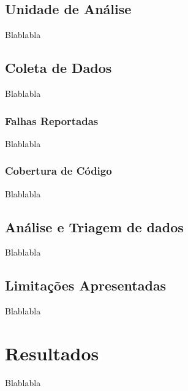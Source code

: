 \documentclass[11.5pt]{article}
\begin{document}
\subsection{Unidade de Análise}
Blablabla


\subsection{Coleta de Dados}
Blablabla

\subsubsection{Falhas Reportadas}
Blablabla

\subsubsection{Cobertura de Código}
Blablabla


\subsection{Análise e Triagem de dados}
Blablabla


\subsection{Limitações Apresentadas}
Blablabla




\section{Resultados}
Blablabla

\end{document}
